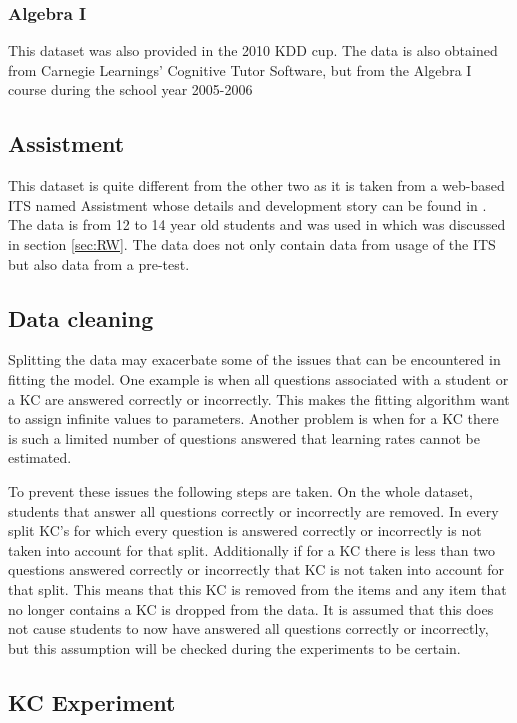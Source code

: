 \documentclass{scrartcl}
\begin{document}
\subsubsection{Algebra I}
This dataset was also provided in the 2010 KDD cup. The data is also obtained from Carnegie Learnings' Cognitive Tutor Software, but from the Algebra I course during the school year 2005-2006 \cite{algebra}

\subsection{Assistment}
This dataset is quite different from the other two as it is taken from a web-based ITS named Assistment whose details and development story can be found in \cite{razzaq}. The data is from 12 to 14 year old students and was used in \cite{ktpfa} which was discussed in section \ref{sec:RW}. The data does not only contain data from usage of the ITS but also data from a pre-test.
\subsection{Data cleaning}
\label{sec:cleaning}
Splitting the data may exacerbate some of the issues that can be encountered in fitting the model. One example is when all questions associated with a student or a KC are answered correctly or incorrectly. This makes the fitting algorithm want to assign infinite values to parameters. Another problem is when for a KC there is such a limited number of questions answered that learning rates cannot be estimated.

To prevent these issues the following steps are taken. On the whole dataset, students that answer all questions correctly or incorrectly are removed. In every split KC's for which every question is answered correctly or incorrectly is not taken into account for that split. Additionally if for a KC there is less than two questions answered correctly or incorrectly that KC is not taken into account for that split. This means that this KC is removed from the items and any item that no longer contains a KC is dropped from the data. It is assumed that this does not cause students to now have answered all questions correctly or incorrectly, but this assumption will be checked during the experiments to be certain.

\subsection{KC Experiment}
\end{document}
